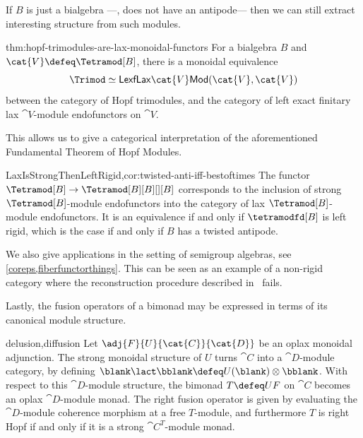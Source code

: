 If \(B\) is just a bialgebra%
—\ie, does not have an antipode—%
then we can still extract interesting structure from such modules.

\begin{reptheorem}{thm:hopf-trimodules-are-lax-monoidal-functors}
  For a bialgebra \(B\) and \(\cat{V} \defeq \Tetramod[B]\),
  there is a monoidal equivalence
  \[
    \Trimod \simeq \mathsf{LexfLax}\cat{V}\mathsf{Mod}(\cat{V}, \cat{V})
  \]
  between the category of Hopf trimodules, and
  the category of left exact finitary lax \(\cat{V}\)\hyp{}module endofunctors on \(\cat{V}\).
\end{reptheorem}

This allows us to give a categorical interpretation of
the aforementioned Fundamental Theorem of Hopf Modules.

\begin{reptheorem}{LaxIsStrongThenLeftRigid,cor:twisted-anti-iff-bestoftimes}
  The functor \(\Tetramod[B] \to \Tetramod[B][B][][B]\) corresponds to
  the inclusion of strong \(\Tetramod[B]\)\hyp{}module endofunctors into the category of lax \(\Tetramod[B]\)\hyp{}module endofunctors.
  It is an equivalence if and only if
  \(\tetramodfd[B]\) is left rigid,
  which is the case if and only if \(B\) has a twisted antipode.
\end{reptheorem}

We also give applications in the setting of semigroup algebras, see \cref{coreps,fiberfunctorthings}.
This can be seen as an example of a non-rigid category
where the reconstruction procedure described in~\cite[Chapter~7]{Etingof2015} fails.

Lastly, the fusion operators of a bimonad may be expressed in terms of its canonical module structure.

\begin{reptheorem}{delusion,diffusion}
  Let \(\adj{F}{U}{\cat{C}}{\cat{D}}\) be an oplax monoidal adjunction.
  The strong monoidal structure of \(U\) turns \(\cat{C}\) into a \(\cat{D}\)\hyp{}module category, by defining \(\blank \lact \bblank \defeq U(\blank) \otimes \bblank\).
  With respect to this \(\cat{D}\)\hyp{}module structure,
  the bimonad \(T \defeq UF\) on \(\cat{C}\) becomes an oplax \(\cat{D}\)\hyp{}module monad.
  The right fusion operator is given by
  evaluating the \(\cat{D}\)\hyp{}module coherence morphism at a free \(T\)\hyp{}module,
  and furthermore \(T\) is right Hopf
  if and only if
  it is a strong \(\cat{C}^T\)\hyp{}module monad.
\end{reptheorem}

